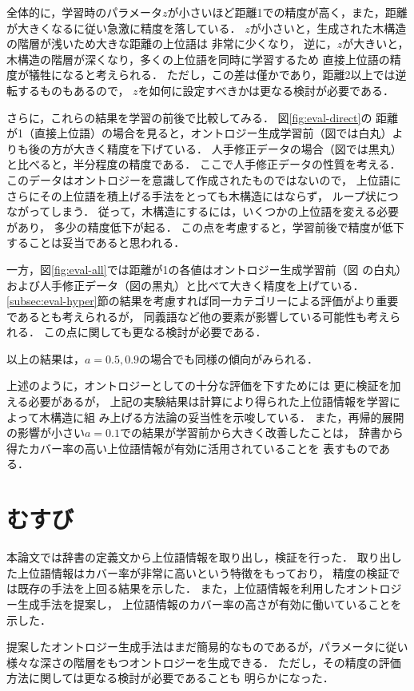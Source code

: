 \documentclass[japanese]{jnlp_1.4}
\begin{document}
全体的に，学習時のパラメータ$z$が小さいほど距離1での精度が高く，また，距離が大きくなるに従い急激に精度を落している．
$z$が小さいと，生成された木構造の階層が浅いため大きな距離の上位語は
非常に少くなり，
逆に，$z$が大きいと，木構造の階層が深くなり，多くの上位語を同時に学習するため
直接上位語の精度が犠牲になると考えられる．
ただし，この差は僅かであり，距離2以上では逆転するものもあるので，
$z$を如何に設定すべきかは更なる検討が必要である．

さらに，これらの結果を学習の前後で比較してみる．
図\ref{fig:eval-direct}の
距離が1（直接上位語）の場合を見ると，オントロジー生成学習前（図では白丸）よりも後の方が大きく精度を下げている．
人手修正データの場合（図では黒丸）と比べると，半分程度の精度である．
ここで人手修正データの性質を考える．
このデータはオントロジーを意識して作成されたものではないので，
上位語にさらにその上位語を積上げる手法をとっても木構造にはならず，
ループ状につながってしまう．
従って，木構造にするには，いくつかの上位語を変える必要があり，
多少の精度低下が起る．
この点を考慮すると，学習前後で精度が低下することは妥当であると思われる．

一方，図\ref{fig:eval-all}では距離が1の各値はオントロジー生成学習前（図
の白丸）および人手修正データ（図の黒丸）と比べて大きく精度を上げている．
\ref{subsec:eval-hyper}節の結果を考慮すれば同一カテゴリーによる評価がより重要であるとも考えられるが，
同義語など他の要素が影響している可能性も考えられる．
この点に関しても更なる検討が必要である．

以上の結果は，$a=0.5,0.9$の場合でも同様の傾向がみられる．

上述のように，オントロジーとしての十分な評価を下すためには
更に検証を加える必要があるが，
上記の実験結果は計算により得られた上位語情報を学習によって木構造に組
み上げる方法論の妥当性を示唆している．
また，再帰的展開の影響が小さい$a=0.1$での結果が学習前から大きく改善したことは，
辞書から得たカバー率の高い上位語情報が有効に活用されていることを
表すものである．


\section{むすび}

本論文では辞書の定義文から上位語情報を取り出し，検証を行った．
取り出した上位語情報はカバー率が非常に高いという特徴をもっており，
精度の検証では既存の手法を上回る結果を示した．
また，上位語情報を利用したオントロジー生成手法を提案し，
上位語情報のカバー率の高さが有効に働いていることを示した．

提案したオントロジー生成手法はまだ簡易的なものであるが，パラメータに従い
様々な深さの階層をもつオントロジーを生成できる．
ただし，その精度の評価方法に関しては更なる検討が必要であることも
明らかになった．
\end{document}
